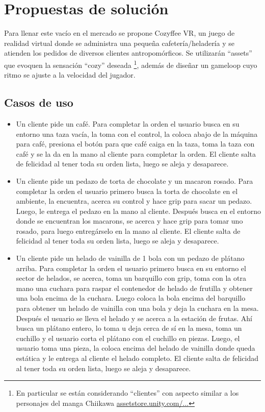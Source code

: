 \documentclass[conference]{IEEEtran}
\begin{document}
\section{Propuestas de solución}

Para llenar este vacío en el mercado se propone Cozyffee VR, un juego de realidad virtual donde se administra una pequeña cafetería/heladería y se atienden los pedidos de diversos clientes antropomórficos. Se utilizarán “assets” que evoquen la sensación “cozy” deseada \footnote{En particular se están considerando “clientes” con aspecto similar a los personajes del manga Chiikawa \href{https://assetstore.unity.com/packages/3d/characters/humanoids/fantasy/little-friends-cartoon-animals-258966}{assetstore.unity.com/...}}, además de diseñar un gameloop cuyo ritmo se ajuste a la velocidad del jugador. \medskip

\subsection*{Casos de uso}

\begin{itemize}
    \item Un cliente pide un café. Para completar la orden el usuario busca en su entorno una taza vacía, la toma con el control, la coloca abajo de la máquina para café, presiona el botón para que café caiga en la taza, toma la taza con café y se la da en la mano al cliente para completar la orden. El cliente salta de felicidad al tener toda su orden lista, luego se aleja y desaparece.\medskip

    \item Un cliente pide un pedazo de torta de chocolate y un macaron rosado. Para completar la orden el usuario primero busca la torta de chocolate en el ambiente, la encuentra, acerca su control y hace grip para sacar un pedazo. Luego, le entrega el pedazo en la mano al cliente. Después busca en el entorno donde se encuentran los macarons, se acerca y hace grip para tomar uno rosado, para luego entregárselo en la mano al cliente. El cliente salta de felicidad al tener toda su orden lista, luego se aleja y desaparece. \medskip

    \item Un cliente pide un helado de vainilla de 1 bola con un pedazo de plátano arriba. Para completar la orden el usuario primero busca en su entorno el sector de helados, se acerca, toma un barquillo con grip, toma con la otra mano una cuchara para raspar el contenedor de helado de frutilla y obtener una bola encima de la cuchara. Luego coloca la bola encima del barquillo para obtener un helado de vainilla con una bola y deja la cuchara en la mesa. Después el usuario se lleva el helado y se acerca a la estación de frutas. Ahí busca un plátano entero, lo toma u deja cerca de sí en la mesa, toma un cuchillo y el usuario corta el plátano con el cuchillo en piezas. Luego, el usuario toma una pieza, la coloca encima del helado de vainilla donde queda estática y le entrega al cliente el helado completo. El cliente salta de felicidad al tener toda su orden lista, luego se aleja y desaparece. \medskip
\end{itemize}
\end{document}
